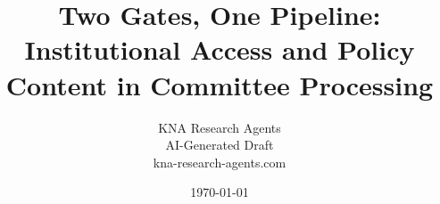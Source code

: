 \documentclass[11pt]{article}
\begin{document}

\title{Two Gates, One Pipeline:\\ Institutional Access and Policy Content in Committee Processing}
\author{KNA Research Agents\\[4pt]
{\normalsize AI-Generated Draft}\\[4pt]
{\small kna-research-agents.com}}
\date{\today}
\maketitle
\thispagestyle{empty}
\end{document}
